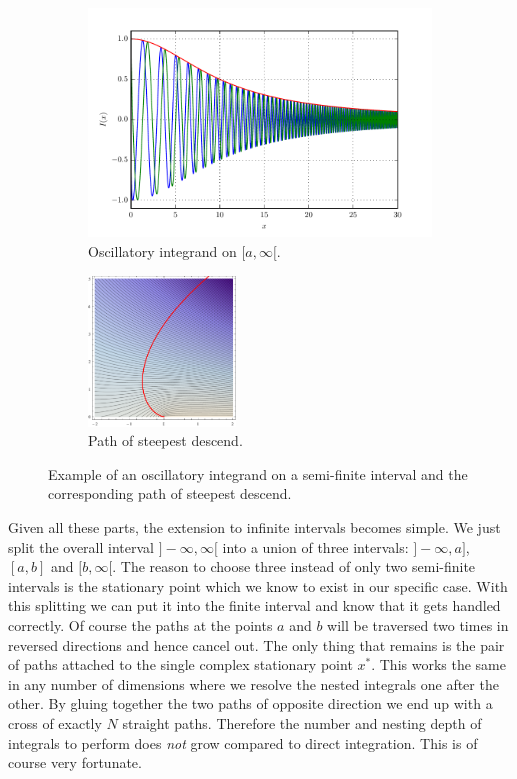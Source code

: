 \documentclass[a4paper,10pt]{article}
\begin{document}
\begin{figure}[h!]
  \begin{subfigure}[t]{0.5\linewidth}
    \centering
    \includegraphics[width=\linewidth]{./fig/oscillatory_example_semiopen.pdf}
    \caption{Oscillatory integrand on $[a, \infty[$.}
    \label{fig:oscillatory_example_semiopen_integrand}
  \end{subfigure}
  \begin{subfigure}[t]{0.5\linewidth}
    \centering
    \includegraphics[height=4cm]{./fig/oscillatory_example_semiopen_path.pdf}
    \caption{Path of steepest descend.}
    \label{fig:oscillatory_example_semiopen_path}
  \end{subfigure}
  \caption{\label{fig:oscillatory_example_semiopen}
  Example of an oscillatory integrand on a semi-finite interval and the
  corresponding path of steepest descend.}
\end{figure}

Given all these parts, the extension to infinite intervals becomes simple.
We just split the overall interval $]-\infty, \infty[$ into a union of three
intervals: $]-\infty, a]$, $[a,b]$ and $[b,\infty[$. The reason to choose three
instead of only two semi-finite intervals is the stationary point which we know
to exist in our specific case. With this splitting we can put it into the finite
interval and know that it gets handled correctly. Of course the paths at the points
$a$ and $b$ will be traversed two times in reversed directions and hence cancel out.
The only thing that remains is the pair of paths attached to the single complex stationary
point $x^{*}$. This works the same in any number of dimensions where we resolve the nested
integrals one after the other. By gluing together the two paths of opposite direction
we end up with a cross of exactly $N$ straight paths. Therefore the number and nesting
depth of integrals to perform does \emph{not} grow compared to direct integration.
This is of course very fortunate.
\end{document}
